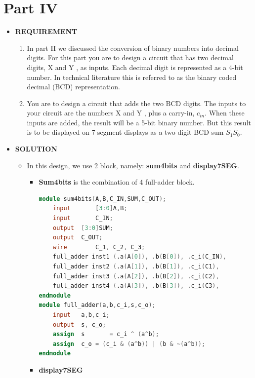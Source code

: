 \section{Part IV}
\begin{itemize}
    \item []\textbf{REQUIREMENT}
        \begin{enumerate}
            \item In part II we discussed the conversion of binary numbers into decimal digits. For this part you are to design a circuit that has two decimal digits, X and Y , as inputs. Each decimal digit is represented as a 4-bit number. In technical literature this is referred to as the binary coded decimal (BCD) representation.
            \item You are to design a circuit that adds the two BCD digits. The inputs to your circuit are the numbers X and Y , plus a carry-in, $c_{in}$. When these inputs are added, the result will be a 5-bit binary number. But this result is to be displayed on 7-segment displays as a two-digit BCD sum $S_1S_0$. 
        \end{enumerate}
    \item []\textbf{SOLUTION}
        \begin{itemize}
            \item []In this design, we use 2 block, namely: \textbf{sum4bits} and \textbf{display7SEG}.
                \begin{itemize}
                    \item []\textbf{Sum4bits} is the combination of 4 full-adder block.
                        \begin{lstlisting}[language=verilog]
module sum4bits(A,B,C_IN,SUM,C_OUT);
	input		[3:0]A,B;
	input		C_IN;
	output	[3:0]SUM;
	output	C_OUT;
	wire		C_1, C_2, C_3;
	full_adder inst1 (.a(A[0]), .b(B[0]), .c_i(C_IN),                      .s(SUM[0]), .c_o(C1));
	full_adder inst2 (.a(A[1]), .b(B[1]), .c_i(C1),                        .s(SUM[1]), .c_o(C2));
	full_adder inst3 (.a(A[2]), .b(B[2]), .c_i(C2),                        .s(SUM[2]), .c_o(C3));
	full_adder inst4 (.a(A[3]), .b(B[3]), .c_i(C3),                        .s(SUM[3]), .c_o(C_OUT));
endmodule
module full_adder(a,b,c_i,s,c_o);
	input 	a,b,c_i;
	output	s, c_o;
	assign 	s 		= c_i ^ (a^b);
	assign 	c_o	= (c_i & (a^b)) | (b & ~(a^b));
endmodule 
                        \end{lstlisting}
                    \item []\textbf{display7SEG}
                        \begin{lstlisting}[language=verilog]

\end{lstlisting}
\end{itemize}
\end{itemize}
\end{itemize}
